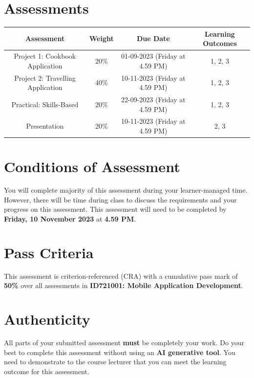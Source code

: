 \documentclass{article}
\begin{document}
\section*{Assessments}
\renewcommand{\arraystretch}{1.5}
\begin{tabular}{|c|c|c|c|}
	\hline
	\textbf{Assessment} & \textbf{Weight} & \textbf{Due Date}    & \textbf{Learning Outcomes} \\ \hline
	Project 1: Cookbook Application            & 20\%            & 01-09-2023 (Friday at 4.59 PM)  & 1, 2, 3                    \\ \hline
	Project 2: Travelling Application            & 40\%            & 10-11-2023 (Friday at 4.59 PM)  & 1, 2, 3                    \\ \hline
	Practical: Skills-Based           & 20\%            & 22-09-2023 (Friday at 4.59 PM)  & 1, 2, 3                    \\ \hline
	Presentation       & 20\%            & 10-11-2023 (Friday at 4.59 PM) & 2, 3                       \\ \hline
\end{tabular}

\section*{Conditions of Assessment}
You will complete majority of this assessment during your learner-managed time. However, there will be time during class to discuss the requirements and your progress on this assessment. This assessment will need to be completed by \textbf{Friday, 10 November 2023} at \textbf{4.59 PM}.

\section*{Pass Criteria}
This assessment is criterion-referenced (CRA) with a cumulative pass mark of \textbf{50\%} over all assessments in \textbf{ID721001: Mobile Application Development}.

\section*{Authenticity}
All parts of your submitted assessment \textbf{must} be completely your work. Do your best to complete this assessment without using an \textbf{AI generative tool}. You need to demonstrate to the course lecturer that you can meet the learning outcome for this assessment. \\
 
\end{document}
